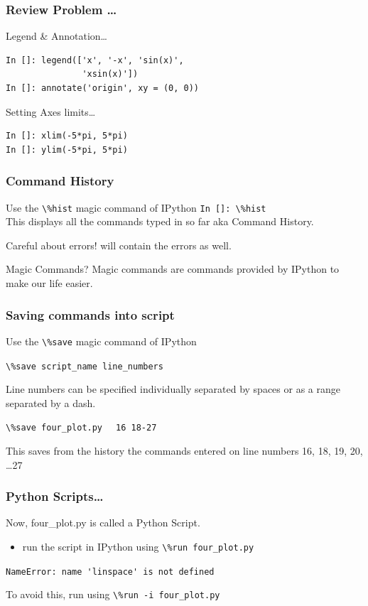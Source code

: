 \documentclass[14pt,compress]{beamer}
\newcommand{\typ}[1]{\lstinline{#1}}
\newcommand{\kwrd}[1]{ \texttt{\textbf{\color{blue}{#1}}}  }
\begin{document}
\begin{frame}[fragile]
\frametitle{Review Problem \ldots}
\alert{Legend \& Annotation\ldots}
\begin{lstlisting}
In []: legend(['x', '-x', 'sin(x)', 
               'xsin(x)'])
In []: annotate('origin', xy = (0, 0))
\end{lstlisting}
\alert{Setting Axes limits\ldots}
\begin{lstlisting}
In []: xlim(-5*pi, 5*pi)
In []: ylim(-5*pi, 5*pi)
\end{lstlisting}
\end{frame}

\begin{frame}[fragile]
\frametitle{Command History}
Use the \typ{\%hist} \alert{magic} command of IPython 
\typ{In []: \%hist}\\
This displays all the commands typed in so far aka Command History.
\begin{block}{Careful about errors!}
  \kwrd{\%hist} will contain the errors as well.\\
\end{block}
\begin{block}{Magic Commands?}
  Magic commands are commands provided by IPython to make our life easier.
\end{block}
\end{frame}

\begin{frame}[fragile]
  \frametitle{Saving commands into script}
Use the \typ{\%save} \alert{magic} command of IPython
\begin{block}{}
\typ{\%save script_name line_numbers}
\end{block}
Line numbers can be specified individually separated by spaces or as a range separated by a dash.\\
\begin{block}{}
\typ{\%save four_plot.py} \alert{\typ{  16 18-27}} \\  
\end{block}
This saves from the history the commands entered on line numbers \alert{16, 18, 19, 20, \ldots 27}
\end{frame}

\begin{frame}
\frametitle{Python Scripts\ldots}
Now, four\_plot.py is called a Python Script.
 \begin{itemize}
 \item run the script in IPython using \typ{\%run four_plot.py}\\
 \end{itemize}
\pause
\alert{\typ{NameError: name 'linspace' is not defined}}
\begin{block}{}
To avoid this, run using \alert{\typ{\%run -i four_plot.py}}\\
\end{block}
\end{frame}
\end{document}
